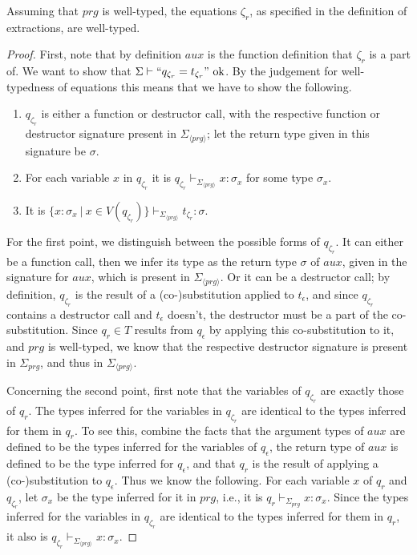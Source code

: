 \begin{lemma}
Assuming that $prg$ is well-typed, the equations $\zeta_r$, as specified in the definition of extractions, are well-typed.

\begin{proof}
First, note that by definition $aux$ is the function definition that $\zeta_r$ is a part of. We want to show that $\Sigma \vdash `` q_{\zeta_r} = t_{\zeta_r} " \textrm{ ok}$. By the judgement for well-typedness of equations this means that we have to show the following.
\begin{enumerate}
\item $q_{\zeta_r}$ is either a function or destructor call, with the respective function or destructor signature present in $\Sigma_{\langle prg \rangle}$; let the return type given in this signature be $\sigma$.

\item For each variable $x$ in $q_{\zeta_r}$ it is $q_{\zeta_r} \vdash_{\Sigma_{\langle prg \rangle}} x : \sigma_x$ for some type $\sigma_x$.

\item It is $\{ x : \sigma_x ~ | ~ x \in V(q_{\zeta_r}) \} \vdash_{\Sigma_{\langle prg \rangle}} t_{\zeta_r} : \sigma$.
\end{enumerate}
For the first point, we distinguish between the possible forms of $q_{\zeta_r}$. It can either be a function call, then we infer its type as the return type $\sigma$ of $aux$, given in the signature for $aux$, which is present in $\Sigma_{\langle prg \rangle}$. Or it can be a destructor call; by definition, $q_{\zeta_r}$ is the result of a (co-)substitution applied to $t_\epsilon$, and since $q_{\zeta_r}$ contains a destructor call and $t_\epsilon$ doesn't, the destructor must be a part of the co-substitution. Since $q_r \in T$ results from $q_\epsilon$ by applying this co-substitution to it, and $prg$ is well-typed, we know that the respective destructor signature is present in $\Sigma_{prg}$, and thus in $\Sigma_{\langle prg \rangle}$.

Concerning the second point, first note that the variables of $q_{\zeta_r}$ are exactly those of $q_r$. The types inferred for the variables in $q_{\zeta_r}$ are identical to the types inferred for them in $q_r$. To see this, combine the facts that the argument types of $aux$ are defined to be the types inferred for the variables of $q_\epsilon$, the return type of $aux$ is defined to be the type inferred for $q_\epsilon$, and that $q_r$ is the result of applying a (co-)substitution to $q_\epsilon$. Thus we know the following. For each variable $x$ of $q_r$ and $q_{\zeta_r}$, let $\sigma_x$ be the type inferred for it in $prg$, i.e., it is $q_r \vdash_{\Sigma_{prg}} x : \sigma_x$. Since the types inferred for the variables in $q_{\zeta_r}$ are identical to the types inferred for them in $q_r$, it also is $q_{\zeta_r} \vdash_{\Sigma_{\langle prg \rangle}} x : \sigma_x$.


\end{proof}
\end{lemma}
